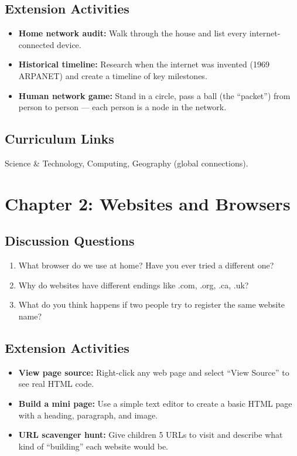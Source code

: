 \subsection*{Extension Activities}
\begin{itemize}
  \item \textbf{Home network audit:} Walk through the house and list every internet-connected device.
  \item \textbf{Historical timeline:} Research when the internet was invented (1969 ARPANET) and create a timeline of key milestones.
  \item \textbf{Human network game:} Stand in a circle, pass a ball (the ``packet'') from person to person — each person is a node in the network.
\end{itemize}

\subsection*{Curriculum Links}
Science \& Technology, Computing, Geography (global connections).

\sectionrule

\section*{Chapter 2: Websites and Browsers}

\subsection*{Discussion Questions}
\begin{enumerate}
  \item What browser do we use at home? Have you ever tried a different one?
  \item Why do websites have different endings like .com, .org, .ca, .uk?
  \item What do you think happens if two people try to register the same website name?
\end{enumerate}

\subsection*{Extension Activities}
\begin{itemize}
  \item \textbf{View page source:} Right-click any web page and select ``View Source'' to see real HTML code.
  \item \textbf{Build a mini page:} Use a simple text editor to create a basic HTML page with a heading, paragraph, and image.
  \item \textbf{URL scavenger hunt:} Give children 5 URLs to visit and describe what kind of ``building'' each website would be.
\end{itemize}

